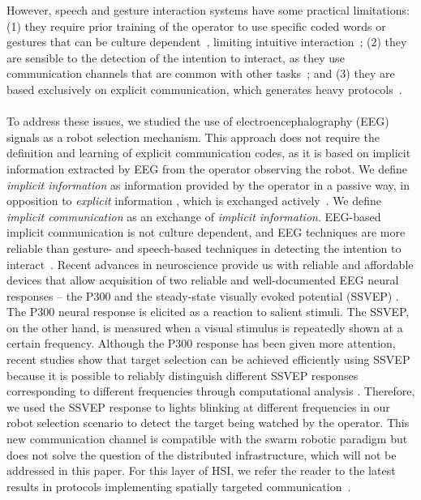 \documentclass[smallextended]{svjour3}
\begin{document}
However, speech and gesture interaction systems have some practical limitations: (1) they require prior training of the operator to use specific coded words or gestures that can be culture dependent~\cite{Trovato2013}, limiting intuitive interaction~\cite{Kirchner2015};
(2) they are sensible to the detection of the intention to interact, as they use communication channels that are common with other tasks~\cite{Rzepecki2012}; and (3) they are based exclusively on explicit communication, which generates heavy protocols~\cite{Kirchner2015}.\\
\\ 
To address these issues, we studied the use of electroencephalography (EEG) signals as a robot selection mechanism. 
This approach does not require the definition and learning of explicit communication codes, as it is based on implicit information extracted by EEG from the operator observing the robot. 
We define \textit{implicit information} as information provided by the operator in a passive way, in opposition to \textit{explicit} information , which is exchanged actively~\cite{Kirchner2015}.
We define \textit{implicit communication} as an exchange of \textit{implicit information}.
EEG-based implicit communication is not culture dependent, and EEG techniques are more reliable than gesture- and speech-based techniques in detecting the intention to interact~\cite{Rzepecki2012}.
Recent advances in neuroscience provide us with reliable and affordable devices that allow acquisition of two reliable and well-documented EEG neural responses -- the P300 and the steady-state visually evoked potential (SSVEP) \cite{Beverina2003,Bi2013,Zhu2010}. 
The P300 neural response is elicited as a reaction to salient stimuli. 
The SSVEP, on the other hand, is measured when a visual stimulus is repeatedly shown at a certain frequency. Although the P300 response has been given more attention, recent studies show that target selection can be achieved efficiently using SSVEP because it is possible to reliably distinguish different SSVEP responses corresponding to different frequencies through computational analysis \cite{SSVEPfiability}.
Therefore, we used the SSVEP response to lights blinking at different frequencies in our robot selection scenario to detect the target being watched by the operator. This new communication channel is compatible with the swarm robotic paradigm but does not solve the question of the distributed infrastructure, which will not be addressed in this paper. For this layer of HSI, we refer the reader to the latest results in protocols implementing spatially targeted communication~\cite{mathews2015spatially}.\\ 
\end{document}
